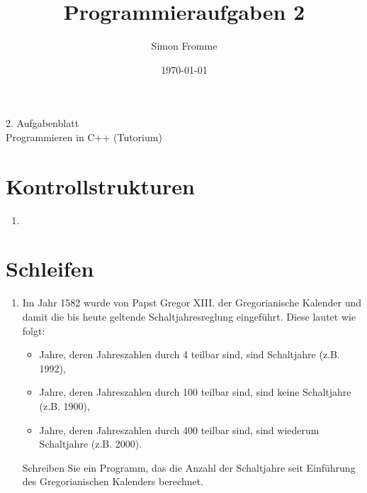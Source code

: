 \documentclass[paper=a4, fontsize=11pt, twoside]{scrartcl}
\title{Programmieraufgaben 2}
\author{Simon Fromme}
\date{\normalsize\today}
\begin{document}
\vspace*{0.75\baselineskip}
\begin{center}
  \Large 2. Aufgabenblatt \\\vspace{0.5em} \large Programmieren in C++ (Tutorium)
\end{center}

\section*{Kontrollstrukturen}
\begin{enumerate}
\item 
\end{enumerate}

\section*{Schleifen}
\begin{enumerate}[resume]
 \item Im Jahr 1582 wurde von  Papst Gregor XIII. der Gregorianische Kalender und damit die bis heute geltende Schaltjahresreglung eingeführt. Diese lautet wie folgt:
   \begin{itemize}
   \item Jahre, deren Jahreszahlen durch 4 teilbar sind, sind Schaltjahre (z.B. 1992), 
   \item Jahre, deren Jahreszahlen durch 100 teilbar sind, sind keine Schaltjahre (z.B. 1900), 
   \item Jahre, deren Jahreszahlen durch 400 teilbar sind, sind wiederum Schaltjahre (z.B. 2000).
   \end{itemize}
   Schreiben Sie ein Programm, das die Anzahl der Schaltjahre seit Einführung des Gregorianischen Kalenders berechnet.
\end{enumerate}
\end{document}
